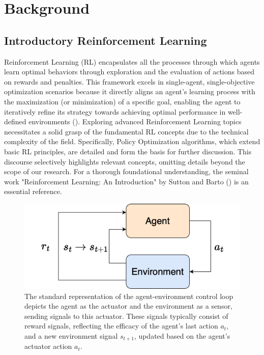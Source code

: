 \section{Background}
\label{sec:background}

\subsection{Introductory Reinforcement Learning}
\label{sec:rl}

    \noindent Reinforcement Learning (RL) encapsulates all the processes through which agents learn optimal behaviors through exploration and the evaluation of actions based on rewards and penalties. This framework excels in single-agent, single-objective optimization scenarios because it directly aligns an agent's learning process with the maximization (or minimization) of a specific goal, enabling the agent to iteratively refine its strategy towards achieving optimal performance in well-defined environments (\textcolor{deepblue}{\cite{Lee_2020}}). Exploring advanced Reinforcement Learning topics necessitates a solid grasp of the fundamental RL concepts due to the technical complexity of the field. Specifically, Policy Optimization algorithms, which extend basic RL principles, are detailed and form the basis for further discussion. This discourse selectively highlights relevant concepts, omitting details beyond the scope of our research. For a thorough foundational understanding, the seminal work "Reinforcement Learning: An Introduction" by Sutton and Barto (\textcolor{deepblue}{\cite{Sutton1998}}) is an essential reference.
    
    \bigskip
    
    \begin{figure}[htbp]
        \centering
        \includegraphics[width=0.6\linewidth]{images/intro/background/rl_simple.png}
         \captionsetup{justification=justified, singlelinecheck=false, width=1\linewidth, labelfont=bf}
        \caption{The standard representation of the agent-environment control loop depicts the agent as the actuator and the environment as a sensor, sending signals to this actuator. These signals typically consist of reward signals, reflecting the efficacy of the agent's last action $a_t$, and a new environment signal $s_{t+1}$, updated based on the agent's actuator action $a_t$.}
        \label{fig:rl_simple}
    \end{figure}
    
